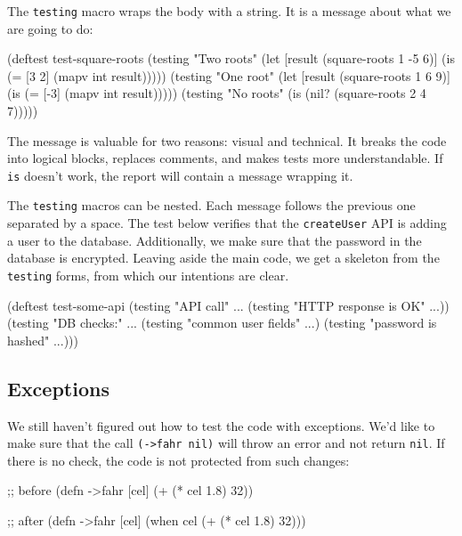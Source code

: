 The \verb|testing| macro wraps the body with a string. It is a message about what we are going to do:

\begin{english}
  \begin{clojure}
(deftest test-square-roots
  (testing "Two roots"
    (let [result (square-roots 1 -5 6)]
      (is (= [3 2] (mapv int result)))))
  (testing "One root"
    (let [result (square-roots 1 6 9)]
      (is (= [-3] (mapv int result)))))
  (testing "No roots"
    (is (nil? (square-roots 2 4 7)))))
  \end{clojure}
\end{english}

The message is valuable for two reasons: visual and technical. It breaks the code into logical blocks, replaces comments, and makes tests more understandable. If \verb|is| doesn't work, the report will contain a message wrapping it.

The \verb|testing| macros can be nested. Each message follows the previous one separated by a space. The test below verifies that the \verb|createUser| API is adding a user to the database. Additionally, we make sure that the password in the database is encrypted. Leaving aside the main code, we get a skeleton from the \verb|testing| forms, from which our intentions are clear.

\begin{english}
  \begin{clojure}
(deftest test-some-api
  (testing "API call" ...
    (testing "HTTP response is OK" ...))
  (testing "DB checks:" ...
    (testing "common user fields" ...)
    (testing "password is hashed" ...)))
  \end{clojure}
\end{english}

\subsection{Exceptions}


We still haven't figured out how to test the code with exceptions. We'd like to make sure that the call \verb|(->fahr nil)| will throw an error and not return \verb|nil|. If there is no check, the code is not protected from such changes:

\ifnarrow

\begin{english}
  \begin{clojure}
;; before
(defn ->fahr [cel]
  (+ (* cel 1.8) 32))
  \end{clojure}

\splitter

  \begin{clojure}
;; after
(defn ->fahr [cel]
  (when cel
    (+ (* cel 1.8) 32)))
  \end{clojure}
\end{english}

